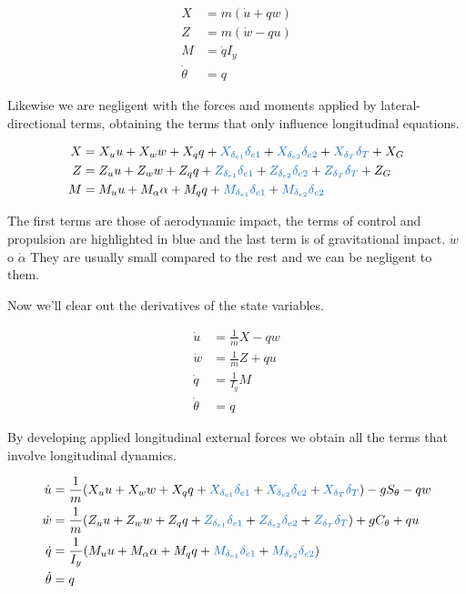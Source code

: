\begin{align} 
X &= m (\dot u + qw) \\
Z &= m (\dot w - qu) \\
M &=  \dot q I_{y} \\
\dot \theta &= q
\end{align}

Likewise we are negligent with the forces and moments applied by lateral-directional terms, obtaining the terms that only influence longitudinal equations. 

\begin{align}
    X &= X_u u + X_w w  + X_q q + \textcolor{RoyalBlue}{X_{\delta_{e1}} \delta_{e1}}  + \textcolor{RoyalBlue}{X_{\delta_{e2}} \delta_{e2}}+ \textcolor{RoyalBlue}{X_{\delta_{T}} \delta_{T}} + X_G  \\
    Z &= Z_u u + Z_w w + Z_q q + \textcolor{RoyalBlue}{Z_{\delta_{e1}} \delta_{e1}}  + \textcolor{RoyalBlue}{Z_{\delta_{e2}} \delta_{e2}} + \textcolor{RoyalBlue}{Z_{\delta_{T}} \delta_{T}} + Z_G  \\
    M &= M_u u + M_\alpha \alpha + M_q q + \textcolor{RoyalBlue}{M_{\delta_{e1}} \delta_{e1}}  + \textcolor{RoyalBlue}{M_{\delta_{e2}} \delta_{e2}}
\end{align}

The first terms are those of aerodynamic impact, the terms of control and propulsion are highlighted in blue and the last term is of gravitational impact. $\dot w$ o $\dot \alpha$ They are usually small compared to the rest and we can be negligent to them. 

Now we'll clear out the derivatives of the state variables. 

\begin{align} 
\dot u &= \frac{1}{m}X - qw \\
\dot w &= \frac{1}{m}Z + qu \\
\dot q &= \frac{1}{I_{y}}M   \\
\dot \theta &= q
\end{align}

By developing applied longitudinal external forces we obtain all the terms that involve longitudinal dynamics. 

\begin{align} 
\label{eq: modelo longitudinal w}
\dot u &= \frac{1}{m}(X_u u + X_w w + X_q q + \textcolor{RoyalBlue}{X_{\delta_{e1}} \delta_{e1}}  + \textcolor{RoyalBlue}{X_{\delta_{e2}} \delta_{e2}}+ \textcolor{RoyalBlue}{X_{\delta_{T}} \delta_{T}}) - g S_{\theta} - qw \\
\dot w &= \frac{1}{m}(Z_u u + Z_w w + Z_q q + \textcolor{RoyalBlue}{Z_{\delta_{e1}} \delta_{e1}}  + \textcolor{RoyalBlue}{Z_{\delta_{e2}} \delta_{e2}} + \textcolor{RoyalBlue}{Z_{\delta_{T}} \delta_{T}}) + g C_{\theta} + qu \\
\dot q &= \frac{1}{I_{y}}(M_u u + M_\alpha \alpha + M_q q + \textcolor{RoyalBlue}{M_{\delta_{e1}} \delta_{e1}}  + \textcolor{RoyalBlue}{M_{\delta_{e2}} \delta_{e2}})  \\
\dot \theta &= q
\end{align}

